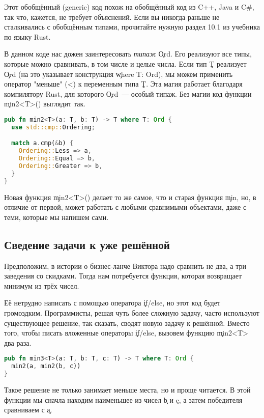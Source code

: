 Этот обобщённый (generic) код похож на обобщённый код из C++, Java и C\#, так что, кажется, не требует объяснений.
Если вы никогда раньше не сталкивались с обобщённым типами, прочитайте нужную раздел 10.1 \cite{rustlang} из учебника по языку Rust.

В данном коде нас дожен заинтересовать {\em типаж} \c{Ord}.
Его реализуют все типы, которые можно сравнивать, в том числе и целые числа.
Если тип \c{T} реализует \c{Ord} (на это указывает конструкция \c{where T: Ord}), мы можем применить оператор "меньше" (<) к переменным типа \c{T}.
Эта магия работает благодаря компилятору Rust, для которого \c{Ord}~--- особый типаж.
Без магии код функции \c{min2<T>()} выглядит так.

\begin{lstlisting}[language=Rust]
pub fn min2<T>(a: T, b: T) -> T where T: Ord {
  use std::cmp::Ordering;

  match a.cmp(&b) {
    Ordering::Less => a,
    Ordering::Equal => b,
    Ordering::Greater => b,
  }
}
\end{lstlisting}

Новая функция \c{min2<T>()} делает то же самое, что и старая функция \c{min}, но, в отличие от первой, может работать с любыми сравнимыми объектами, даже с теми, которые мы напишем сами.

\subsection{Сведение задачи к уже решённой}

Предположим, в истории о бизнес-ланче Виктора надо сравнить не два, а три заведения со скидками.
Тогда нам потребуется функция, которая возвращает минимум из трёх чисел.

Её нетрудно написать с помощью оператора \c{if/else}, но этот код будет громоздким.
Программисты, решая чуть более сложную задачу, часто используют существующее решение, так сказать, сводят новую задачу к решённой.
Вместо того, чтобы писать вложенные операторы \c{if/else}, вызовем функцию \c{min2<T>} два раза.

\begin{lstlisting}[language=Rust]
pub fn min3<T>(a: T, b: T, c: T) -> T where T: Ord {
  min2(a, min2(b, c))
}
\end{lstlisting}

Такое решение не только занимает меньше места, но и проще читается.
В этой функции мы сначла находим наименьшее из чисел \c{b} и \c{c}, а затем победителя сравниваем с \c{a}.

